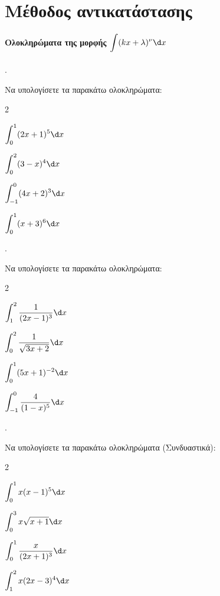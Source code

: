 \documentclass[11pt,a4paper,twocolumn]{article}
\newcounter{askhsh}
\newcommand{\askhsh}{\large\theaskhsh.\ \addtocounter{askhsh}{1}}
\begin{document}
\section{Μέθοδος αντικατάστασης}

\paragraph{Ολοκληρώματα της μορφής $\displaystyle\int (kx+\lambda)^\nu \d x$}
\askhsh Να υπολογίσετε τα παρακάτω ολοκληρώματα:
\begin{multicols}{2}
\begin{alist}
\item $\displaystyle\int_{0}^{1} (2x+1)^5 \d x$
\item $\displaystyle\int_{0}^{2} (3-x)^4 \d x$
\item $\displaystyle\int_{-1}^{0} (4x+2)^{3} \d x$
\item $\displaystyle\int_{0}^{1} (x+3)^6 \d x$
\end{alist}
\end{multicols}

\askhsh Να υπολογίσετε τα παρακάτω ολοκληρώματα:
\begin{multicols}{2}
\begin{alist}
\item $\displaystyle\int_{1}^{2} \dfrac{1}{(2x-1)^3} \d x$
\item $\displaystyle\int_{0}^{2} \dfrac{1}{\sqrt{3x+2}} \d x$
\item $\displaystyle\int_{0}^{1} (5x+1)^{-2} \d x$
\item $\displaystyle\int_{-1}^{0} \dfrac{4}{(1-x)^5} \d x$
\end{alist}
\end{multicols}

\askhsh Να υπολογίσετε τα παρακάτω ολοκληρώματα (Συνδυαστικά):
\begin{multicols}{2}
\begin{alist}
\item $\displaystyle\int_{0}^{1} x(x-1)^5 \d x$
\item $\displaystyle\int_{0}^{3} x \sqrt{x+1} \d x$
\item $\displaystyle\int_{0}^{1} \dfrac{x}{(2x+1)^3} \d x$
\item $\displaystyle\int_{1}^{2} x(2x-3)^4 \d x$
\end{alist}
\end{multicols}
\end{document}
